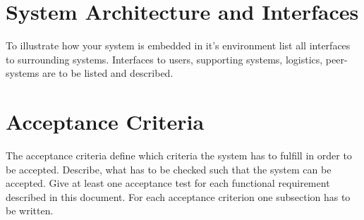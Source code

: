 \documentclass[12pt]{article}
\theoremstyle{definition}
\newenvironment{explanation}{%
   \setlength{\parindent}{0pt}
   \itshape
   \color{blue}
}{}
\begin{document}
\pagebreak
\section{System Architecture and Interfaces}
\begin{explanation}
To illustrate how your system is embedded in it’s environment list all interfaces to surrounding systems. Interfaces to users, supporting systems, logistics, peer-systems are to be listed and described.
\end{explanation}

\pagebreak
\section{Acceptance Criteria}
\begin{explanation}
The acceptance criteria define which criteria the system has to fulfill in order to be accepted. Describe, what has to be checked such that the system can be accepted. Give at least one acceptance test for each functional requirement described in this document. For each acceptance criterion one subsection has to be written.
\end{explanation}
\end{document}
